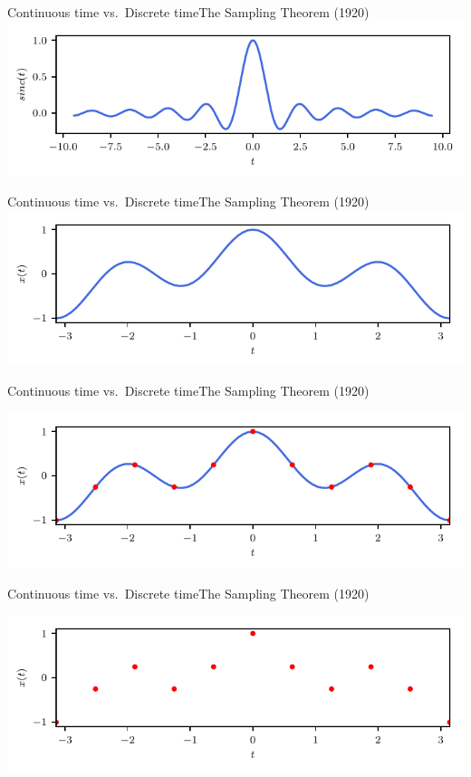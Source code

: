 \documentclass[usenames,dvipsnames,svgnames,10pt,aspectratio=169]{beamer}
\begin{document}
\begin{frame}[t, c]{Continuous time vs.\ Discrete time}{The Sampling Theorem (1920)}
	\centering
	\includegraphics[width=.75\textwidth]{cardinal_sinus}
\end{frame}

\begin{frame}[t, c]{Continuous time vs.\ Discrete time}{The Sampling Theorem (1920)}
	\centering
	\includegraphics[width=.75\textwidth]{Sampling_theorem_a}
\end{frame}

\begin{frame}[t, c]{Continuous time vs.\ Discrete time}{The Sampling Theorem (1920)}
	\addtocounter{framenumber}{-1}
	\centering
	\includegraphics[width=.75\textwidth]{Sampling_theorem_b}
\end{frame}

\begin{frame}[t, c]{Continuous time vs.\ Discrete time}{The Sampling Theorem (1920)}
	\addtocounter{framenumber}{-1}
	\centering
	\includegraphics[width=.75\textwidth]{Sampling_theorem_c}
\end{frame}
\end{document}
